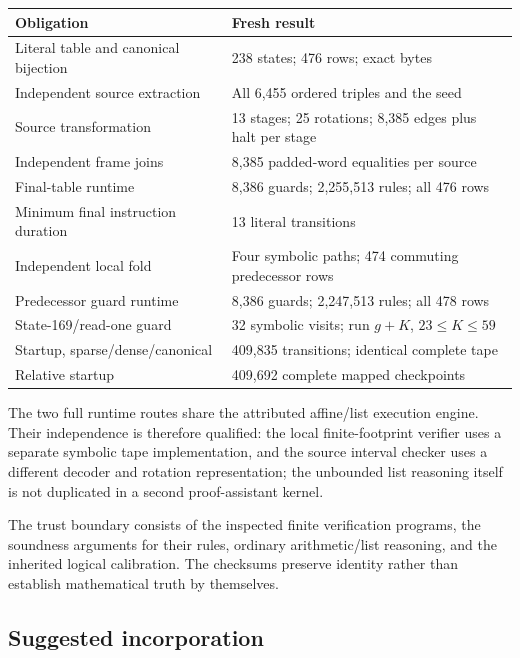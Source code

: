 \begin{center}
\small
\begin{tabular}{@{}L{0.49\textwidth}L{0.43\textwidth}@{}}
\toprule
Obligation & Fresh result\\
\midrule
Literal table and canonical bijection & 238 states; 476 rows; exact bytes\\
Independent source extraction & All 6,455 ordered triples and the seed\\
Source transformation & 13 stages; 25 rotations; 8,385 edges plus halt per stage\\
Independent frame joins & 8,385 padded-word equalities per source\\
Final-table runtime & 8,386 guards; 2,255,513 rules; all 476 rows\\
Minimum final instruction duration & 13 literal transitions\\
Independent local fold & Four symbolic paths; 474 commuting predecessor rows\\
Predecessor guard runtime & 8,386 guards; 2,247,513 rules; all 478 rows\\
State-169/read-one guard & 32 symbolic visits; run $g+K$, $23\le K\le59$\\
Startup, sparse/dense/canonical & 409,835 transitions; identical complete tape\\
Relative startup & 409,692 complete mapped checkpoints\\
\bottomrule
\end{tabular}
\end{center}

The two full runtime routes share the attributed affine/list
execution engine. Their independence is therefore qualified:
the local finite-footprint verifier uses a separate symbolic
tape implementation, and the source interval checker uses a
different decoder and rotation representation; the unbounded
list reasoning itself is not duplicated in a second
proof-assistant kernel.

The trust boundary consists of the inspected finite
verification programs, the soundness arguments for their
rules, ordinary arithmetic/list reasoning, and the inherited
logical calibration. The checksums preserve identity rather
than establish mathematical truth by themselves.

\subsection{Suggested incorporation}

